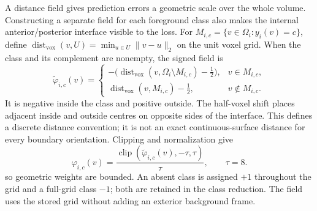 \documentclass[12pt,a4paper]{article}
\begin{document}
A distance field gives prediction errors a geometric scale over the whole
volume. Constructing a separate field for each foreground class also
makes the internal anterior/posterior interface visible to the loss.
For $M_{i,c}=\{v\in\Omega_i:y_i(v)=c\}$, define
$\operatorname{dist}_{\mathrm{vox}}(v,U)=\min_{u\in U}\|v-u\|_2$
on the unit voxel grid. When the class and its complement are nonempty,
the signed field is
\begin{equation}
\widetilde\varphi_{i,c}(v)=
\begin{cases}
-\bigl(\operatorname{dist}_{\mathrm{vox}}
       (v,\Omega_i\setminus M_{i,c})-\tfrac12\bigr),
   &v\in M_{i,c},\\[0.4em]
\operatorname{dist}_{\mathrm{vox}}(v,M_{i,c})-\tfrac12,
   &v\notin M_{i,c}.
\end{cases}
\label{eq:sdf-half-voxel-field}
\end{equation}
It is negative inside the class and positive outside. The half-voxel
shift places adjacent inside and outside centres on opposite sides of
the interface. This defines a discrete distance convention; it is not
an exact continuous-surface distance for every boundary orientation.
Clipping and normalization give
\begin{equation}
\varphi_{i,c}(v)
=\frac{\operatorname{clip}
  (\widetilde\varphi_{i,c}(v),-\tau,\tau)}{\tau},
\qquad \tau=8.
\label{eq:sdf-clipped-normalized-field}
\end{equation}
so geometric weights are bounded. An absent class is assigned $+1$
throughout the grid and a full-grid class $-1$; both are retained in
the class reduction. The field uses the stored grid without adding an
exterior background frame.
\end{document}

